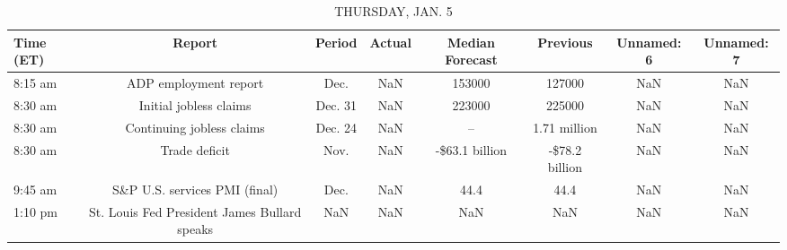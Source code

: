 \documentclass{article}%
\begin{document}
%


\begin{table}[htbp]%
\caption{THURSDAY, JAN. 5}%
\centering%
\begin{adjustbox}{width=1\textwidth}%
\begin{tabular}{lccccccc}
\toprule
Time (ET) &                                       Report &  Period & Actual & Median Forecast &       Previous & Unnamed: 6 & Unnamed: 7 \\
\midrule
  8:15 am &                        ADP employment report &    Dec. &    NaN &          153000 &         127000 &        NaN &        NaN \\
  8:30 am &                       Initial jobless claims & Dec. 31 &    NaN &          223000 &         225000 &        NaN &        NaN \\
  8:30 am &                    Continuing jobless claims & Dec. 24 &    NaN &              -- &   1.71 million &        NaN &        NaN \\
  8:30 am &                                Trade deficit &    Nov. &    NaN &  -\$63.1 billion & -\$78.2 billion &        NaN &        NaN \\
  9:45 am &                S\&P U.S. services PMI (final) &    Dec. &    NaN &            44.4 &           44.4 &        NaN &        NaN \\
  1:10 pm & St. Louis Fed President James Bullard speaks &     NaN &    NaN &             NaN &            NaN &        NaN &        NaN \\
\bottomrule
\end{tabular}
%
\end{adjustbox}%
\end{table}

%
\end{document}
